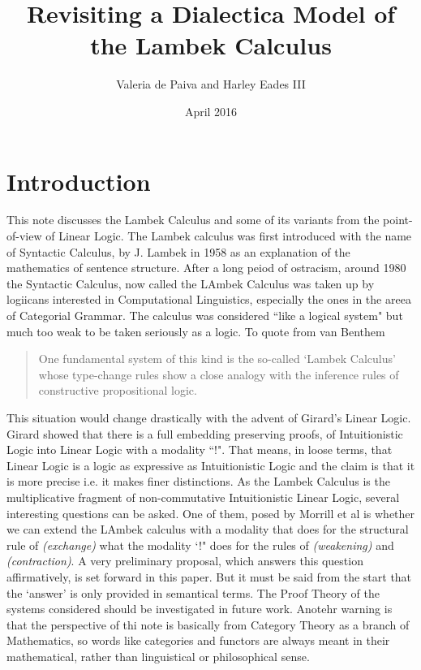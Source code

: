 \documentclass{article}
\title{Revisiting a Dialectica Model of the Lambek Calculus}
\author{Valeria de Paiva and Harley Eades III}
\date{April 2016}
\begin{document}
\maketitle

\section*{Introduction}
This   note discusses the Lambek Calculus  and some of its variants
from the point-of-view of Linear Logic.  The Lambek calculus was first introduced  with the name of Syntactic Calculus, by J. Lambek in 1958 
as an explanation of the mathematics of sentence structure. After a long peiod of ostracism, around 1980 the Syntactic Calculus, now called the LAmbek Calculus was taken up by logiicans interested in Computational Linguistics, especially the ones in the areea of Categorial Grammar. The calculus was considered ``like a logical system" but much too weak
 to be taken seriously as a logic. To quote from van Benthem
 \begin{quotation}One fundamental system of this kind is the so-called `Lambek Calculus' whose type-change rules show a  close analogy with the inference rules of constructive propositional logic.
 \end{quotation}
This situation would change drastically with the advent of Girard's Linear Logic.  Girard showed that there is a full embedding preserving proofs, of Intuitionistic Logic into Linear Logic with a modality ``!". That means, in loose terms, that Linear Logic is a logic as expressive as Intuitionistic Logic and the claim is that it is more precise i.e. it makes finer distinctions. As the Lambek Calculus is the multiplicative fragment of non-commutative Intuitionistic Linear Logic, several interesting questions can be asked. One of them, posed by Morrill et al  is whether we can extend the LAmbek calculus with a modality that does for the structural rule of \textit{(exchange)} what the modality `!" does for the rules of \textit{(weakening)} and \textit{(contraction)}. A very preliminary proposal, which answers this question affirmatively, is set forward in this paper. But it must be said from the start that the `answer' is only provided in semantical terms. The Proof Theory of the systems considered should be investigated in future work. Anotehr warning is that the perspective of thi note is basically from Category Theory as a branch of Mathematics, so words like categories and functors are always meant in their mathematical, rather than linguistical or philosophical sense.
\end{document}
